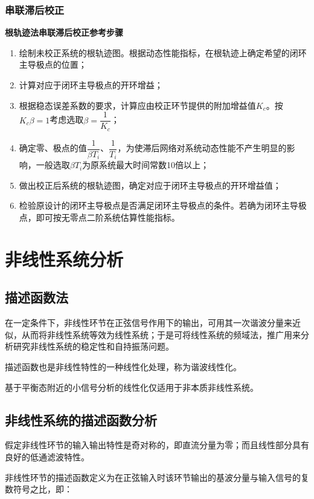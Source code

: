 \documentclass[cn, blue, normal, 12pt]{elegantnote}
\begin{document}
\subsubsection{串联滞后校正}

\textbf{根轨迹法串联滞后校正参考步骤}

\begin{enumerate}
    \setlength{\itemsep}{6pt}
    \item 绘制未校正系统的根轨迹图。根据动态性能指标，在根轨迹上确定希望的闭环主导极点的位置；
    \item 计算对应于闭环主导极点的开环增益；
    \item 根据稳态误差系数的要求，计算应由校正环节提供的附加增益值$K_c$。按$K_c\beta=1$考虑选取$\beta=\dfrac{1}{K_c}$；
    \item 确定零、极点的值$\dfrac{1}{\beta T_i}$、$\dfrac{1}{T_i}$，为使滞后网络对系统动态性能不产生明显的影响，一般选取$\beta T_i$为原系统最大时间常数10倍以上；
    \item 做出校正后系统的根轨迹图，确定对应于闭环主导极点的开环增益值；
    \item 检验原设计的闭环主导极点是否满足闭环主导极点的条件。若确为闭环主导极点，即可按无零点二阶系统估算性能指标。
\end{enumerate}

\section{非线性系统分析}

\subsection{描述函数法}

在一定条件下，非线性环节在正弦信号作用下的输出，可用其一次谐波分量来近似，从而将非线性系统等效为线性系统；于是可将线性系统的频域法，推广用来分析研究非线性系统的稳定性和自持振荡问题。

描述函数也是非线性特性的一种线性化处理，称为谐波线性化。

基于平衡态附近的小信号分析的线性化仅适用于非本质非线性系统。

\subsection{非线性系统的描述函数分析}

假定非线性环节的输入输出特性是奇对称的，即直流分量为零；而且线性部分具有良好的低通滤波特性。

非线性环节的描述函数定义为在正弦输入时该环节输出的基波分量与输入信号的复数符号之比，即：
\end{document}
